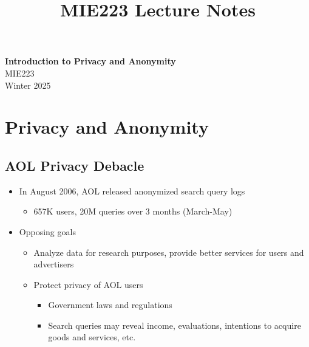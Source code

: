 \documentclass[11pt]{article}
\theoremstyle{definition}
\begin{document}
\setcounter{section}{0}
\title{MIE223 Lecture Notes}

\thispagestyle{empty}

\begin{center}
{\LARGE \bf Introduction to Privacy and Anonymity}\\
{\large MIE223}\\
Winter 2025
\end{center}
\section{Privacy and Anonymity}

\subsection{AOL Privacy Debacle}
\begin{itemize}
    \item In August 2006, AOL released anonymized search
    query logs
    \begin{itemize}
        \item 657K users, 20M queries over 3 months
        (March-May)
    \end{itemize}
    \item Opposing goals
    \begin{itemize}
        \item Analyze data for research purposes, provide
        better services for users and advertisers
        \item Protect privacy of AOL users
        \begin{itemize}
            \item Government laws and regulations
            \item Search queries may reveal income, evaluations,
            intentions to acquire goods and services, etc.
        \end{itemize}
    \end{itemize} 
\end{itemize}
\end{document}

